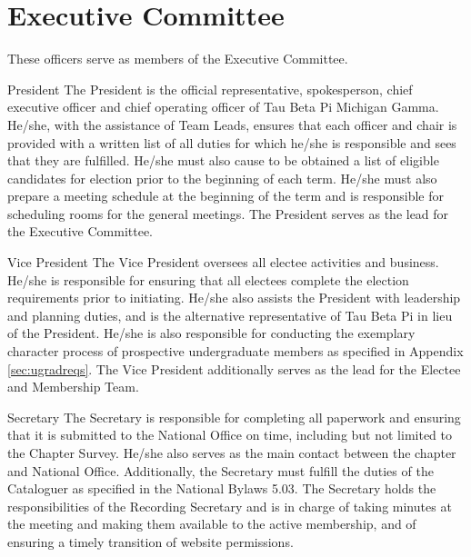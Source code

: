 \section{Executive Committee}\label{sec:ExecComm}
These officers serve as members of the Executive Committee.
\begin{enumsubsection}
\item{President} The President is the official representative, spokesperson, chief executive officer and chief operating officer of Tau Beta Pi Michigan Gamma. He/she, with the assistance of Team Leads, ensures that each officer and chair is provided with a written list of all duties for which he/she is responsible and sees that they are fulfilled.  He/she must also cause to be obtained a list of eligible candidates for election prior to the beginning of each term. He/she must also prepare a meeting schedule at the beginning of the term and is responsible for scheduling rooms for the general meetings. The President serves as the lead for the Executive Committee. 

\item{Vice President} The Vice President oversees all electee activities and business. He/she is responsible for ensuring that all electees complete the election requirements prior to initiating. He/she also assists the President with leadership and planning duties, and is the alternative representative of Tau Beta Pi in lieu of the President. He/she  is also responsible for conducting the exemplary character process of prospective undergraduate members as specified in Appendix \ref{sec:ugradreqs}. The Vice President additionally serves as the lead for the Electee and Membership Team.

\item{Secretary} The Secretary is responsible for completing all paperwork and ensuring that it is submitted to the National Office on time, including but not limited to the Chapter Survey. He/she also serves as the main contact between the chapter and National Office. Additionally, the Secretary must fulfill the duties of the Cataloguer as specified in the National Bylaws 5.03. The Secretary holds the responsibilities of the Recording Secretary and is in charge of taking minutes at the meeting and making them available to the active membership, and of ensuring a timely transition of website permissions.


\end{enumsubsection}
